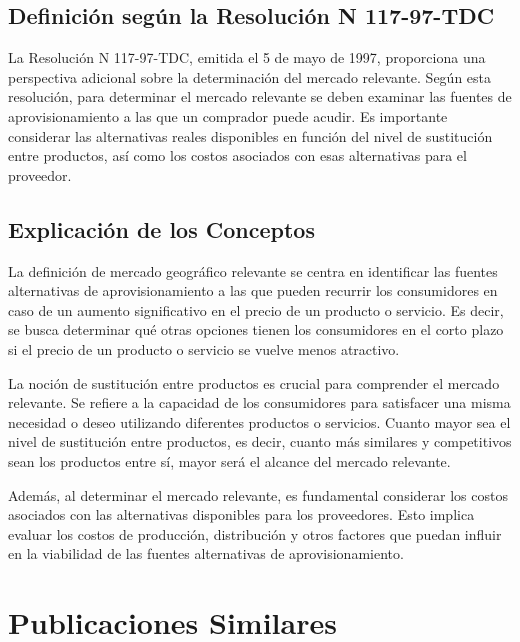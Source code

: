 \documentclass[
  a4paper,
]{article}
\begin{document}
\hypertarget{definiciuxf3n-seguxfan-la-resoluciuxf3n-n-117-97-tdc}{%
\subsection{Definición según la Resolución N
117-97-TDC}\label{definiciuxf3n-seguxfan-la-resoluciuxf3n-n-117-97-tdc}}

La Resolución N 117-97-TDC, emitida el 5 de mayo de 1997, proporciona
una perspectiva adicional sobre la determinación del mercado relevante.
Según esta resolución, para determinar el mercado relevante se deben
examinar las fuentes de aprovisionamiento a las que un comprador puede
acudir. Es importante considerar las alternativas reales disponibles en
función del nivel de sustitución entre productos, así como los costos
asociados con esas alternativas para el proveedor.

\hypertarget{explicaciuxf3n-de-los-conceptos}{%
\subsection{Explicación de los
Conceptos}\label{explicaciuxf3n-de-los-conceptos}}

La definición de mercado geográfico relevante se centra en identificar
las fuentes alternativas de aprovisionamiento a las que pueden recurrir
los consumidores en caso de un aumento significativo en el precio de un
producto o servicio. Es decir, se busca determinar qué otras opciones
tienen los consumidores en el corto plazo si el precio de un producto o
servicio se vuelve menos atractivo.

La noción de sustitución entre productos es crucial para comprender el
mercado relevante. Se refiere a la capacidad de los consumidores para
satisfacer una misma necesidad o deseo utilizando diferentes productos o
servicios. Cuanto mayor sea el nivel de sustitución entre productos, es
decir, cuanto más similares y competitivos sean los productos entre sí,
mayor será el alcance del mercado relevante.

Además, al determinar el mercado relevante, es fundamental considerar
los costos asociados con las alternativas disponibles para los
proveedores. Esto implica evaluar los costos de producción, distribución
y otros factores que puedan influir en la viabilidad de las fuentes
alternativas de aprovisionamiento.

\hypertarget{publicaciones-similares}{%
\section{Publicaciones Similares}\label{publicaciones-similares}}
\end{document}
